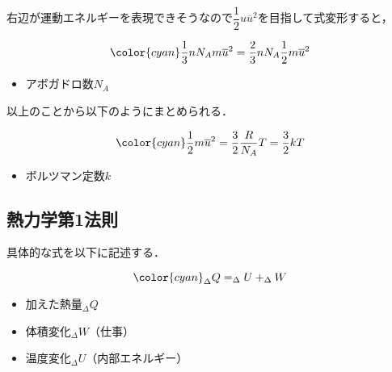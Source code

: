 \documentclass[a4paper,11pt]{ltjsarticle}
\begin{document}
右辺が運動エネルギーを表現できそうなので$\dfrac{1}{2}u \overline{u}^2$を目指して式変形すると，

\begin{equation*}
    {\color{cyan} \dfrac{1}{3} nN_A m \overline{u}^2 = \dfrac{2}{3} nN_A \dfrac{1}{2} m \overline{u}^2}
\end{equation*}

\begin{itemize}
    \item アボガドロ数$N_A$
\end{itemize}

以上のことから以下のようにまとめられる．

\begin{equation*}
    {\color{cyan} \dfrac{1}{2} m \overline{u}^2 = \dfrac{3}{2} \dfrac{R}{N_A}T =\dfrac{3}{2}kT}
\end{equation*}

\begin{itemize}
    \item ボルツマン定数$k$
\end{itemize}

\subsection{熱力学第1法則}

具体的な式を以下に記述する．

\begin{equation*}
    {\color{cyan} _\Delta Q = _\Delta U + _\Delta W}
\end{equation*}

\begin{itemize}
    \item 加えた熱量$_\Delta Q$
    \item 体積変化$_\Delta W$（仕事）
    \item 温度変化$_\Delta U$（内部エネルギー）
\end{itemize}
\end{document}
